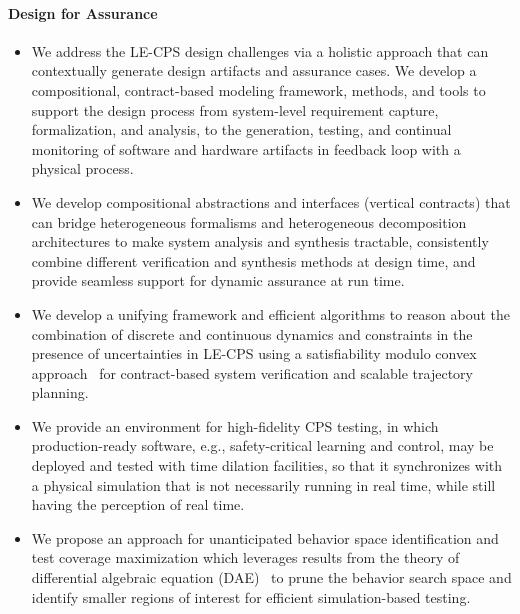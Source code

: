 \documentclass[12pt]{dod-blank}
\begin{document}
\paragraph{Design for Assurance}

\begin{itemize}[itemsep=0pt,leftmargin=*]
\item We address the LE-CPS design challenges via a holistic approach that can contextually generate design artifacts and assurance cases. We develop a compositional, contract-based modeling framework, methods, and tools to support the design process from system-level requirement capture,  formalization, and analysis, to the generation, testing, and continual monitoring of software and hardware artifacts in feedback loop with a physical process.

\item We develop compositional abstractions and interfaces (vertical contracts) that can  bridge heterogeneous formalisms and heterogeneous decomposition architectures to make system analysis and synthesis tractable, consistently combine different verification and synthesis methods at design time, and provide seamless support for dynamic assurance at run time. %

\item We develop a unifying framework and efficient algorithms to reason about the combination of discrete and continuous dynamics and constraints in the presence of uncertainties in LE-CPS using a satisfiability modulo convex approach~\cite{Shoukry2017} for contract-based system verification and scalable trajectory planning.  

\item We provide an environment for high-fidelity CPS testing, in which production-ready software, e.g.,  safety-critical learning and control, may be deployed and tested 
with time dilation facilities, so that it synchronizes with a physical simulation that is not necessarily running in real time, while still having the perception of real time.

\item We 
propose an approach for unanticipated behavior space identification and test coverage maximization which leverages results from the theory of differential algebraic equation (DAE)~\cite{Berger2013ControllabilitySurvey,Ilchmann2005ATheory,BergerOnSystems,Lamour2013} 
to prune the behavior search space and identify smaller regions of interest for efficient simulation-based testing. 
\end{itemize}
\end{document}
